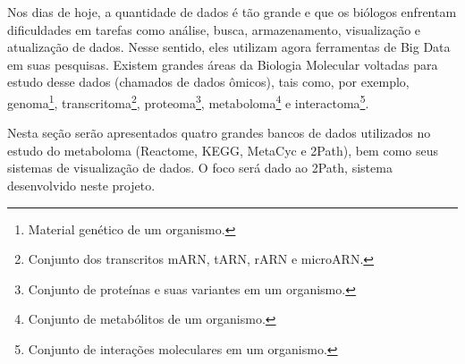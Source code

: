 
\indent Nos dias de hoje, a quantidade de dados é tão grande e  que os biólogos enfrentam dificuldades em tarefas como análise, busca, armazenamento, visualização e atualização de dados. Nesse sentido, eles utilizam agora ferramentas de Big Data em suas pesquisas. Existem grandes áreas da Biologia Molecular voltadas para estudo desse dados (chamados de dados ômicos), tais como, por exemplo, genoma\footnote{Material genético de um organismo.}, transcritoma\footnote{Conjunto dos transcritos mARN, tARN, rARN e microARN.}, proteoma\footnote{Conjunto de proteínas e suas variantes em um organismo.}, metaboloma\footnote{Conjunto de metabólitos de um organismo.} e interactoma\footnote{Conjunto de interações moleculares em um organismo.}.

\indent Nesta seção serão apresentados quatro grandes bancos de dados utilizados no estudo do metaboloma (Reactome, KEGG, MetaCyc e 2Path), bem como seus sistemas de visualização de dados. O foco será dado ao 2Path, sistema desenvolvido neste projeto. 
%
%



